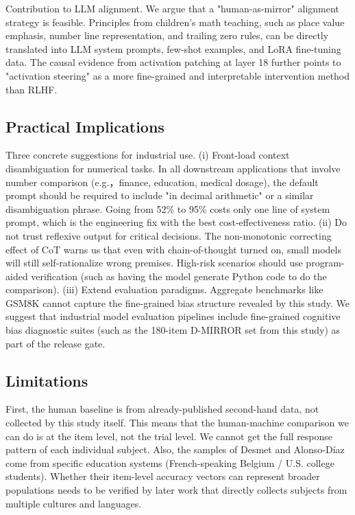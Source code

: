 Contribution to LLM alignment. We argue that a "human-as-mirror" alignment strategy is feasible. Principles from children's math teaching, such as place value emphasis, number line representation, and trailing zero rules, can be directly translated into LLM system prompts, few-shot examples, and LoRA fine-tuning data. The causal evidence from activation patching at layer 18 further points to "activation steering" as a more fine-grained and interpretable intervention method than RLHF.

\subsection{Practical Implications}

Three concrete suggestions for industrial use. (i) Front-load context disambiguation for numerical tasks. In all downstream applications that involve number comparison (e.g.，finance, education, medical dosage), the default prompt should be required to include "in decimal arithmetic" or a similar disambiguation phrase. Going from 52\% to 95\% costs only one line of system prompt, which is the engineering fix with the best cost-effectiveness ratio. (ii) Do not trust reflexive output for critical decisions. The non-monotonic correcting effect of CoT warns us that even with chain-of-thought turned on, small models will still self-rationalize wrong premises. High-risk scenarios should use program-aided verification (such as having the model generate Python code to do the comparison). (iii) Extend evaluation paradigms. Aggregate benchmarks like GSM8K cannot capture the fine-grained bias structure revealed by this study. We suggest that industrial model evaluation pipelines include fine-grained cognitive bias diagnostic suites (such as the 180-item D-MIRROR set from this study) as part of the release gate.

\subsection{Limitations}

First, the human baseline is from already-published second-hand data, not collected by this study itself. This means that the human-machine comparison we can do is at the item level, not the trial level. We cannot get the full response pattern of each individual subject. Also, the samples of Desmet and Alonso-Díaz come from specific education systems (French-speaking Belgium / U.S. college students). Whether their item-level accuracy vectors can represent broader populations needs to be verified by later work that directly collects subjects from multiple cultures and languages.


